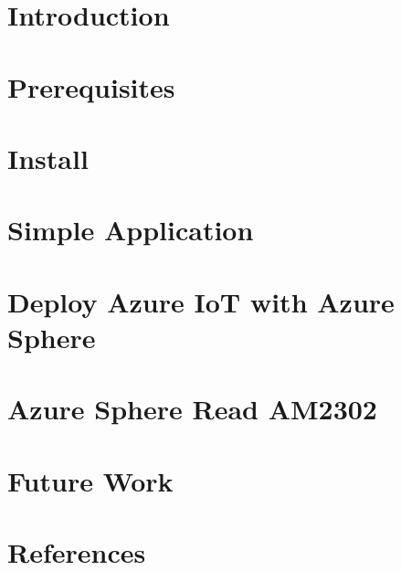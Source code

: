 \section{Introduction}

\newpage

\section{Prerequisites}

\newpage

\section{Install}

\newpage

\section{Simple Application}
\label{sec:sim_app}

\newpage

\section{Deploy Azure IoT with Azure Sphere}

\newpage

\section{Azure Sphere Read AM2302}

\newpage

\section{Future Work}

\newpage

\section{References}

